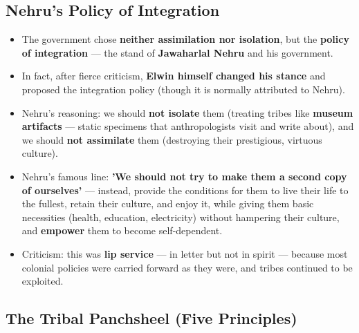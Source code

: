 \subsection{Nehru's Policy of Integration}

\begin{KeyConcept}
\begin{itemize}
\item The government chose \textbf{neither assimilation nor isolation}, but the \textbf{policy of integration} --- the stand of \textbf{Jawaharlal Nehru} and his government.
\item In fact, after fierce criticism, \textbf{Elwin himself changed his stance} and proposed the integration policy (though it is normally attributed to Nehru).
\item Nehru's reasoning: we should \textbf{not isolate} them (treating tribes like \textbf{museum artifacts} --- static specimens that anthropologists visit and write about), and we should \textbf{not assimilate} them (destroying their prestigious, virtuous culture).
\item Nehru's famous line: \textbf{'We should not try to make them a second copy of ourselves'} --- instead, provide the conditions for them to live their life to the fullest, retain their culture, and enjoy it, while giving them basic necessities (health, education, electricity) without hampering their culture, and \textbf{empower} them to become self-dependent.
\item Criticism: this was \textbf{lip service} --- in letter but not in spirit --- because most colonial policies were carried forward as they were, and tribes continued to be exploited.
\end{itemize}
\end{KeyConcept}

\subsection{The Tribal Panchsheel (Five Principles)}

